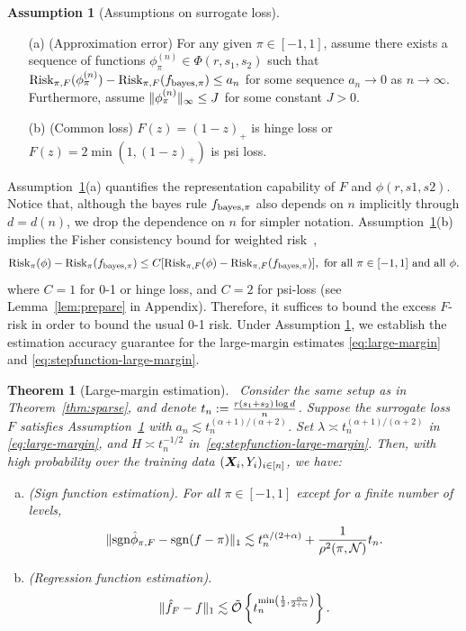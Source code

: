 \documentclass[aos]{imsart}
\newtheorem{theorem}{Theorem}%
\theoremstyle{definition}
\newtheorem{assumption}{Assumption}
\def\sign{\textup{sgn}}
\def\risk{\textup{Risk}}
\def\bayespif{f_{\textup{bayes},\pi}}
\def\riskF{\textup{Risk}_{\pi,F}}
\begin{document}
\begin{assumption}[Assumptions on surrogate loss]\label{ass:main} \hfill
\begin{enumerate}
\item[(a)] (Approximation error) For any given $\pi\in[-1,1]$, assume there exists a sequence of functions $\phi^{(n)}_\pi\in\Phi(r,s_1,s_2)$ such that $\riskF(\phi^{(n)}_\pi)-\riskF(\bayespif)\leq a_n$ for some sequence $a_n\to 0$ as $n\to\infty$. Furthermore, assume $\lVert\phi_{\pi}^{(n)}\rVert_\infty \leq J$ for some constant $J>0$. 
\item[(b)] (Common loss) $F(z)=(1-z)_{+}$ is hinge loss or $F(z)=2\min(1,(1-z)_{+})$ is psi loss. 
\end{enumerate}
\end{assumption}
Assumption~\ref{ass:main}(a) quantifies the representation capability of $F$ and $\phi(r, s1, s2)$. Notice that, although the bayes rule $\bayespif$ also depends on $n$ implicitly through $d=d(n)$, we drop the dependence on $n$ for simpler notation. Assumption~\ref{ass:main}(b) implies the Fisher consistency bound for weighted risk~\cite{scott2011surrogate},
\begin{equation}\label{eq:fisher}
\risk_\pi(\phi)-\risk_\pi(\bayespif)\leq C[\riskF(\phi)-\riskF(\bayespif)], \text{ for all $\pi\in[-1,1]$ and all $\phi$}.
\end{equation}
where $C=1$ for 0-1 or hinge loss, and $C=2$ for psi-loss (see Lemma~\ref{lem:prepare} in Appendix). Therefore, it suffices to bound the excess $F$-risk in order to bound the usual 0-1 risk. 
Under Assumption \ref{ass:main}, we establish the estimation accuracy guarantee for the large-margin estimates \eqref{eq:large-margin} and \eqref{eq:stepfunction-large-margin}. 

\begin{theorem}[Large-margin estimation]~\label{thm:extension} 
Consider the same setup as in Theorem~\ref{thm:sparse}, and denote $t_n : = {r(s_1+s_2)\log d \over n}$.
Suppose the surrogate loss $F$ satisfies Assumption~\ref{ass:main} with $a_n \lesssim t_n^{(\alpha+1)/(\alpha+2)}$. Set $\lambda\asymp t_n^{(\alpha+1)/(\alpha+2)}$ in \eqref{eq:large-margin}, and $H\asymp t_n^{-1/2}$ in~\eqref{eq:stepfunction-large-margin}. Then, with high probability over the training data $(\bm X_i,Y_i)_{i\in[n]}$, we have:
\begin{enumerate}[(a)]
\item (Sign function estimation). For all $\pi\in[-1,1]$ except for a finite number of levels,
\begin{equation*}
\onenormSize{}{\sign\hat \phi_{\pi,F}-\sign(f-\pi)}\lesssim t_n ^{\alpha/(2+\alpha)}+{1\over \rho^2(\pi,\tN)}t_n.
\end{equation*}

\item (Regression function estimation). 
\begin{equation*}
\onenormSize{}{\hat f_{F}- f} \lesssim \tilde \tO\left\{t_n^{\min\left( {1\over 2},{\alpha \over 2+\alpha} \right)}\right\}.
\end{equation*}
\end{enumerate}
\end{theorem}
\end{document}
